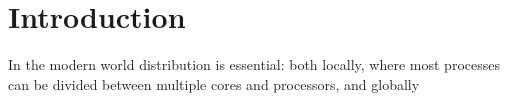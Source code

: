 \section{Introduction}

In the modern world distribution is essential: both locally, where most processes can be divided between multiple cores and processors, and globally 


